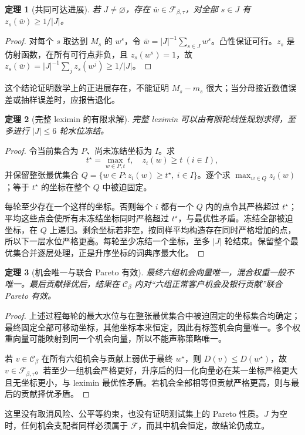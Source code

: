 \documentclass[UTF8,11pt,fontset=fandol]{ctexart}
\newtheorem{theorem}{定理}[section]
\newcommand{\C}{\mathcal C}
\newcommand{\F}{\mathcal F}
\begin{document}
\begin{theorem}[共同可达进展]
若 $J\ne\varnothing$，存在 $\bar w\in\F_{\beta,\tau}$，对全部 $s\in J$ 有 $z_s(\bar w)\ge1/|J|$。
\end{theorem}
\begin{proof}
对每个 $s$ 取达到 $M_s$ 的 $w^s$，令 $\bar w=|J|^{-1}\sum_{s\in J}w^s$。凸性保证可行。$z_s$ 是仿射函数，在所有可行点非负，且 $z_s(w^s)=1$，故 $z_s(\bar w)=|J|^{-1}\sum_jz_s(w^j)\ge1/|J|$。
\end{proof}
这个结论证明数学上的正进展存在，不能证明 $M_s-m_s$ 很大；当分母接近数值误差或抽样误差时，应报告退化。

\begin{theorem}[完整 leximin 的有限求解]
完整 leximin 可以由有限轮线性规划求得，至多进行 $|J|\le6$ 轮水位冻结。
\end{theorem}
\begin{proof}
令当前集合为 $P$、尚未冻结坐标为 $I$。求
\[
t^\star=\max_{w\in P,t}t,\quad z_i(w)\ge t\ (i\in I),
\]
并保留整张最优集合 $Q=\{w\in P:z_i(w)\ge t^\star,\ i\in I\}$。逐个求 $\max_{w\in Q}z_i(w)$；等于 $t^\star$ 的坐标在整个 $Q$ 中被迫固定。

每轮至少存在一个这样的坐标。否则每个 $i$ 都有一个 $Q$ 内的点令其严格超过 $t^\star$；平均这些点会使所有未冻结坐标同时严格超过 $t^\star$，与最优性矛盾。冻结全部被迫坐标，在 $Q$ 上递归。剩余坐标若非空，按同样平均构造存在同时严格增加的点，所以下一层水位严格更高。每轮至少冻结一个坐标，至多 $|J|$ 轮结束。保留整个最优集合并逐层处理，正是升序坐标的词典序最大化。
\end{proof}

\begin{theorem}[机会唯一与联合 Pareto 有效]
最终六组机会向量唯一，混合权重一般不唯一。最后贡献择优后，结果在 $\C_\beta$ 内对“六组正常客户机会及银行贡献”联合 Pareto 有效。
\end{theorem}
\begin{proof}
上述过程每轮的最大水位与在整张最优集合中被迫固定的坐标集合均确定；最终固定全部可移动坐标，其他坐标本来恒定，因此有标签机会向量唯一。多个权重向量可能映射到同一个机会向量，所以不能声称策略唯一。

若 $v\in\C_\beta$ 在所有六组机会与贡献上弱优于最终 $w^\star$，则 $D(v)\le D(w^\star)$，故 $v\in\F_{\beta,\tau}$。若至少一组机会严格更好，升序后的归一化向量必在某一坐标严格更大且无坐标更小，与 leximin 最优性矛盾。若机会全部相等但贡献严格更高，则与最后的贡献择优矛盾。
\end{proof}
这里没有取消风险、公平等约束，也没有证明测试集上的 Pareto 性质。$J$ 为空时，任何机会支配者同样必须属于 $\F$，而其中机会恒定，故结论仍成立。
\end{document}
